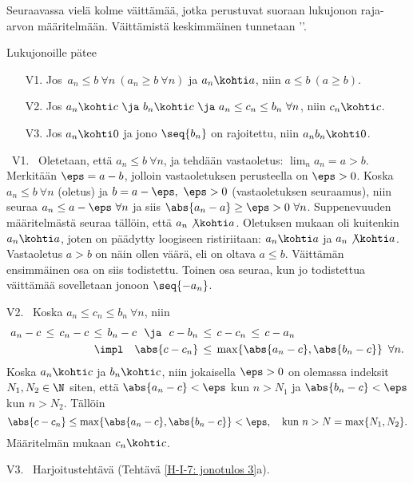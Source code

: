 Seuraavassa vielä kolme väittämää, jotka perustuvat suoraan lukujonon raja-arvon 
määritelmään. Väittämistä keskimmäinen tunnetaan ''.
\begin{Lause} \label{jonotuloksia} 
Lukujonoille pätee
\begin{itemize}
\item[V1.] Jos $\,a_n \le b\ \forall n\ (a_n \ge b\ \forall n)$ ja $a_n \kohti a$,
           niin $a \le b\ (a \ge b)$.
\item[V2.] Jos $a_n \kohti c\ \ja\ b_n \kohti c\ \ja\ a_n \le c_n \le b_n\ \forall n$,
           niin $c_n \kohti c$. 
\item[V3.] Jos $a_n \kohti 0$ ja jono $\seq{b_n}$ on rajoitettu, niin $a_n b_n \kohti 0$.
\end{itemize}
\end{Lause}
\tod \ V1. \ Oletetaan, että $a_n \le b\ \forall n$, ja tehdään vastaoletus: 
$\lim_n a_n = a > b$. Merkitään $\eps = a-b$, jolloin vastaoletuksen perusteella on $\eps > 0$.
Koska $a_n \le b\ \forall n$ (oletus) ja $b = a-\eps,\ \eps > 0$ (vastaoletuksen seuraamus),
niin seuraa $a_n \le a - \eps\ \forall n$ ja siis $\abs{a_n - a} \ge \eps > 0\ \forall n$. 
Suppenevuuden määritelmästä seuraa tällöin, että $a_n \not\kohti a$. Oletuksen mukaan oli 
kuitenkin $a_n \kohti a$, joten on päädytty loogiseen ristiriitaan: $a_n \kohti a$ ja 
$a_n \not\kohti a$. Vastaoletus $a>b$ on näin ollen väärä, eli on oltava $a \le b$. Väittämän 
ensimmäinen osa on siis todistettu. Toinen osa seuraa, kun jo todistettua väittämää
sovelletaan jonoon $\seq{-a_n}$.

V2. \ Koska $a_n \le c_n \le b_n\ \forall n$, niin
\begin{align*}
a_n-c\,\le\,c_n-c\,\le\,b_n-c\ \ \ja\ \ c-b_n\,&\le\,c-c_n\,\le\,c-a_n \\
                   \impl \quad \abs{c-c_n}\,&\le\,\max\{\abs{a_n-c},\abs{b_n-c}\} \,\ \forall n.
\end{align*}
Koska $a_n \kohti c$ ja $b_n \kohti c$, niin jokaisella $\eps>0$ on olemassa indeksit 
$N_1,N_2\in\N$ siten, että $\abs{a_n-c}<\eps$ kun $n>N_1$ ja $\abs{b_n-c}<\eps$ kun $n>N_2$.
Tällöin
\[
\abs{c-c_n} \le \max\{\abs{a_n-c},\abs{b_n-c}\} < \eps, \quad \text{kun}\ n>N=\max\{N_1,N_2\}.
\]
Määritelmän mukaan $c_n \kohti c$.

V3. \ Harjoitustehtävä (Tehtävä \ref{H-I-7: jonotulos 3}a). \loppu

